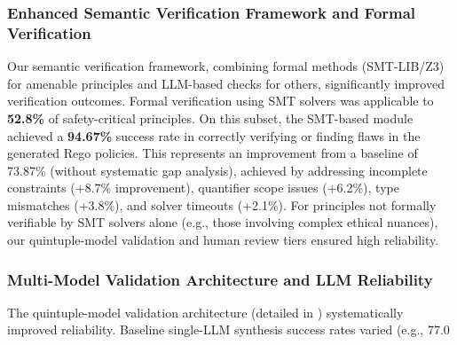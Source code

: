 \documentclass[manuscript,screen,review,anonymous,9pt]{acmart}
\begin{document}
\subsubsection{Enhanced Semantic Verification Framework and Formal Verification}
\label{subsubsec:enhanced_verification}
Our semantic verification framework, combining formal methods (SMT-LIB/Z3) for amenable principles and LLM-based checks for others, significantly improved verification outcomes. Formal verification using SMT solvers was applicable to \textbf{52.8\%} of safety-critical principles. On this subset, the SMT-based module achieved a \textbf{94.67\%} success rate in correctly verifying or finding flaws in the generated Rego policies. This represents an improvement from a baseline of 73.87\% (without systematic gap analysis), achieved by addressing incomplete constraints (+8.7\% improvement), quantifier scope issues (+6.2\%), type mismatches (+3.8\%), and solver timeouts (+2.1\%). For principles not formally verifiable by SMT solvers alone (e.g., those involving complex ethical nuances), our quintuple-model validation and human review tiers ensured high reliability.

\subsubsection{Multi-Model Validation Architecture and LLM Reliability}
\label{subsubsec:multi_model_validation_reliability}
The quintuple-model validation architecture (detailed in ) systematically improved reliability. Baseline single-LLM synthesis success rates varied (e.g., 77.0%
\end{document}
